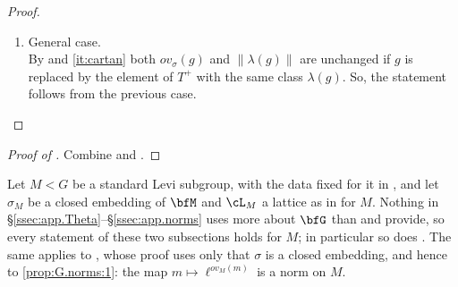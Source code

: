 \documentclass[12pt,a4paper]{amsart}%
\newcommand{\RamiC}[1]{{{#1}}}
\begin{document}
\begin{proof}
\begin{enumerate}[{Case} 1.]
\RamiC{For any $g\in T$ } write $g=ab$ with $a\in A_\bfT$ and $b\in {\RamiC{C_\bfT}}$. By
\eqref{lem:sigma.basic:2},
$$
ov_\sigma(a)-c_0\leq ov_\sigma(g)\leq ov_\sigma(a)+c_0.
$$
\RamiC{
Thus
\begin{align*}
ov_\sigma(g)&\leq ov_\sigma(a)+c_0\\
&\overset{\eqref{eq:ovsigma.split}}{\leq} c_1\|\lambda(a)\|+c_1+c_0\\
&\leq c_1(\|\lambda(g)\|+c_2)+c_1+c_0\\
&\leq c_3\|\lambda(g)\|+c_3 .
\end{align*}
Similarly
\begin{align*}
c_3^{-1}\|\lambda(g)\|-c_3&\leq c_1^{-1}(\|\lambda(g)\|-c_2)-c_1-c_0\\
&\leq c_1^{-1}\|\lambda(a)\|-c_1-c_0\\
&\overset{\eqref{eq:ovsigma.split}}{\leq} ov_\sigma(a)-c_0\\
&\leq ov_\sigma(g) .
\end{align*}
}
\item \RamiC{General case}.\\
By  and \eqref{it:cartan} both $ov_\sigma(g)$ and
$\|\lambda(g)\|$ are unchanged if $g$ is replaced by the element of $T^+$ with the same class
$\lambda(g)$. \RamiC{So, the statement follows from the previous case.}
\end{enumerate}


\end{proof}

\begin{proof}[Proof of ]
Combine  and .
\end{proof}

\begin{remark}\label{rem:app.Levi}
Let $M<G$ be a standard Levi subgroup, with the data fixed for it in , and let
$\sigma_M$ be a closed embedding of $\bfM$ and $\cL_M$ a lattice as in  for $M$.
Nothing in \S\ref{ssec:app.Theta}--\S\ref{ssec:app.norms} uses more about $\bfG$ than
 and  provide, so every statement of these two subsections
holds for $M$; in particular so does . The same applies to
, whose proof uses only that $\sigma$ is a closed embedding, and hence to
\eqref{prop:G.norms:1}: the map $m\mapsto \ell^{ov_M(m)}$ is a norm on $M$.
\end{remark}
\end{document}
